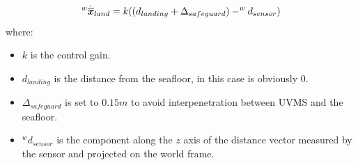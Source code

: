 \documentclass{article}
\begin{document}
\begin{equation}
\large
    ^{w}\dot{\overline{\boldsymbol{x}}}_{land} = k((d_{landing} + \Delta_{safeguard}) - ^w d_{sensor}) %
\end{equation}
where:
\begin{itemize}
    \item $k$ is the control gain.
    \item $d_{landing}$ is the distance from the seafloor, in this case is obviously $0$.
    \item $\Delta_{safeguard}$ is set to $0.15m$  to avoid interpenetration between UVMS and the seafloor.
    \item $^w d_{sensor}$ is the component along the $z$ axis of the distance vector measured by the sensor and projected on the world frame.
\end{itemize} 

\end{document}
